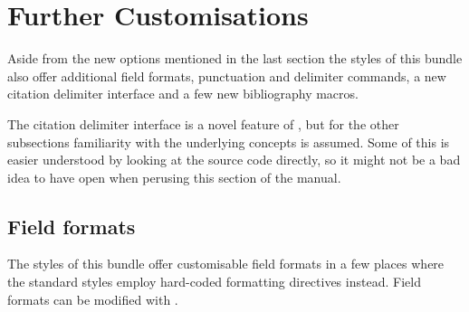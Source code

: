 \documentclass[DIV=9]{scrartcl}
\begin{document}
\clearpage
\section{Further Customisations}\label{sec:opt:cust}
Aside from the new options mentioned in the last section the styles of this
bundle also offer additional field formats, punctuation and delimiter commands,
a new citation delimiter interface and a few new bibliography macros.

The citation delimiter interface is a novel feature of ,
but for the other subsections familiarity with the underlying 
concepts is assumed.
Some of this is easier understood by looking at the source code directly,
so it might not be a bad idea to have  open when
perusing this section of the manual.

\subsection{Field formats}\label{sec:opt:field}
The styles of this bundle offer customisable field formats
in a few places where the standard styles employ hard-coded formatting
directives instead.
Field formats can be modified with .
\end{document}
